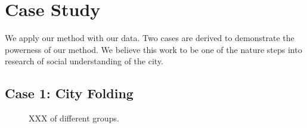 \section{Case Study}
We apply our method with our data. Two cases are derived to demonstrate the powerness of our method. We believe this work to be one of the nature steps into research of social understanding of the city.

\subsection{Case 1: City Folding}

\begin{figure}
\centering
{}\hspace{5pt}
\hspace{5pt}
\hspace{5pt}
\hspace{5pt}
\caption{XXX of different groups.}
\label{case11}
\end{figure}


